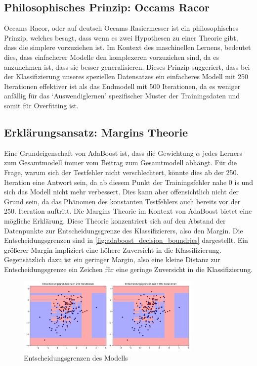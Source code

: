\subsection{Philosophisches Prinzip: Occams Racor}
Occams Racor, oder auf deutsch Occams Rasiermesser ist ein philosophisches Prinzip, welches besagt, dass wenn es zwei Hypothesen zu einer Theorie gibt, dass die simplere vorzuziehen ist. Im Kontext des maschinellen Lernens, bedeutet dies, dass einfacherer Modelle den komplexeren vorzuziehen sind, da es anzunehmen ist, dass sie besser generalisieren. Dieses Prinzip suggeriert, dass bei der Klassifizierung unseres speziellen Datensatzes ein einfacheres Modell mit 250 Iterationen effektiver ist als das Endmodell mit 500 Iterationen, da es weniger anfällig für das `Auswendiglernen' spezifischer Muster der Trainingsdaten und somit für Overfitting ist.

\subsection{Erklärungsansatz: Margins Theorie}
Eine Grundeigenschaft von AdaBoost ist, dass die Gewichtung \(\alpha\) jedes Lerners zum Gesamtmodell immer vom Beitrag zum Gesamtmodell abhängt. Für die Frage, warum sich der Testfehler nicht verschlechtert, könnte dies ab der 250. Iteration eine Antwort sein, da ab diesem Punkt der Trainingsfehler nahe 0 is und sich das Modell nicht mehr verbessert. Dies kann aber offensichtlich nicht der Grund sein, da das Phänomen des konstanten Testfehlers auch bereits vor der 250. Iteration auftritt.
\newline
Die Margins Theorie im Kontext von AdaBoost bietet eine mögliche Erklärung. Diese Theorie konzentriert sich auf den Abstand der Datenpunkte zur Entscheidungsgrenze des Klassifizierers, also den Margin. Die Entscheidungsgrenzen sind in \autoref{fig:adaboost_decision_boundries} dargestellt. Ein größerer Margin impliziert eine höhere Zuversicht in die Klassifizierung. Gegensätzlich dazu ist ein geringer Margin, also eine kleine Distanz zur Entscheidungsgrenze ein Zeichen für eine geringe Zuversicht in die Klassifizierung.
\begin{figure}[h]
    \centering
    \includegraphics[width=0.8\textwidth]{Images/AdaBoost_Decision_Boundaries.png}
    \caption{Entscheidungsgrenzen des Modells}
    \label{fig:adaboost_decision_boundries}
\end{figure}
